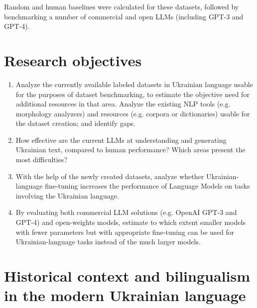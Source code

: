 Random and human baselines were calculated for these datasets, followed by benchmarking a number of commercial and open LLMs (including GPT-3 and GPT-4).

\section{Research objectives}
\label{sec:research-objectives}
\begin{enumerate}
\tightlist
\item Analyze the currently available labeled datasets in Ukrainian language usable for the purposes of dataset benchmarking, to estimate the objective need for additional resources in that area. Analyze the existing NLP tools (e.g. morphology analyzers) and resources (e.g. corpora or dictionaries) usable for the dataset creation; and identify gaps.

\item How effective are the current LLMs at understanding and generating Ukrainian text, compared to human performance? Which areas present the most difficulties?

\item With the help of the newly created datasets, analyze whether Ukrainian-language fine-tuning increases the performance of Language Models on tasks involving the Ukrainian language.


\item By evaluating both commercial LLM solutions (e.g. OpenAI GPT-3 and GPT-4) and open-weights models, estimate to which extent smaller models with fewer parameters but with appropriate fine-tuning can be used for Ukrainian-language tasks instead of the much larger models.

\end{enumerate}


\section{Historical context and bilingualism in the modern Ukrainian
language}\label{historical-context}

